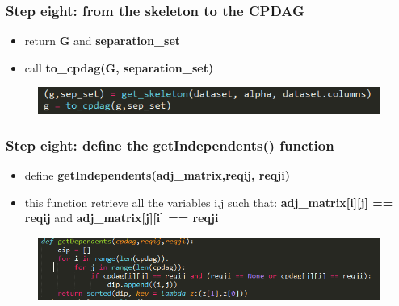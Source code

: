 \documentclass[xcolor ={table,usenames,dvipsnames}]{beamer}
\theoremstyle{definition}
\begin{document}
\begin{frame}
\frametitle{Step eight: from the skeleton to the CPDAG}
\begin{itemize}
	\item return \textbf{G} and \textbf{separation\_set}
	\item call \textbf{to\_cpdag(G, separation\_set)}
\end{itemize}
	\begin{figure}[h!]
		\centering
		\includegraphics[scale=0.5]{img/tocpdag.PNG}
		\label{Interfacce di un CS}
	\end{figure}
\end{frame}

\begin{frame}
\frametitle{Step eight: define the getIndependents() function}
\begin{itemize}
	\item define \textbf{getIndependents(adj\_matrix,reqij, reqji)}
	\item this function retrieve all the variables i,j such that: \textbf{adj\_matrix[i][j] == reqij} and \textbf{adj\_matrix[j][i] == reqji}
\end{itemize}
	\begin{figure}[h!]
		\centering
		\includegraphics[scale=0.5]{img/getindep.PNG}
		\label{Interfacce di un CS}
	\end{figure}
\end{frame}
\end{document}
